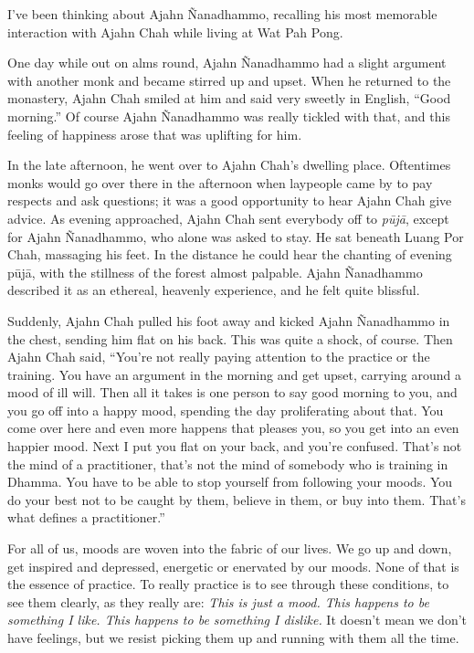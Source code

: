 
I've been thinking about Ajahn Ñanadhammo, recalling his most 
memorable interaction with Ajahn Chah while living at Wat Pah Pong.

One day while out on alms round, Ajahn Ñanadhammo had a slight 
argument with another monk and became stirred up and upset. When he 
returned to the monastery, Ajahn Chah smiled at him and said very 
sweetly in English, ``Good morning.'' Of course Ajahn Ñanadhammo was 
really tickled with that, and this feeling of happiness arose that was 
uplifting for him.

In the late afternoon, he went over to Ajahn Chah's dwelling place. 
Oftentimes monks would go over there in the afternoon when laypeople 
came by to pay respects and ask questions; it was a good opportunity to 
hear Ajahn Chah give advice. As evening approached, Ajahn Chah sent 
everybody off to \emph{pūjā}, except for Ajahn Ñanadhammo, who alone 
was asked to stay. He sat beneath Luang Por Chah, massaging his feet. 
In the distance he could hear the chanting of evening pūjā, with the 
stillness of the forest almost palpable. Ajahn Ñanadhammo described it 
as an ethereal, heavenly experience, and he felt quite blissful.

Suddenly, Ajahn Chah pulled his foot away and kicked Ajahn Ñanadhammo 
in the chest, sending him flat on his back. This was quite a shock, of 
course. Then Ajahn Chah said, ``You're not really paying attention to 
the practice or the training. You have an argument in the morning and 
get upset, carrying around a mood of ill will. Then all it takes is one 
person to say good morning to you, and you go off into a happy mood, 
spending the day proliferating about that. You come over here and even 
more happens that pleases you, so you get into an even happier mood. 
Next I put you flat on your back, and you're confused. That's not the 
mind of a practitioner, that's not the mind of somebody who is training 
in Dhamma. You have to be able to stop yourself from following your 
moods. You do your best not to be caught by them, believe in them, or 
buy into them. That's what defines a practitioner.''

For all of us, moods are woven into the fabric of our lives. We go up 
and down, get inspired and depressed, energetic or enervated by our 
moods. None of that is the essence of practice. To really practice is 
to see through these conditions, to see them clearly, as they really 
are: \emph{This is just a mood. This happens to be something I like. 
This happens to be something I dislike.} It doesn't mean we don't have 
feelings, but we resist picking them up and running with them all the 
time.

